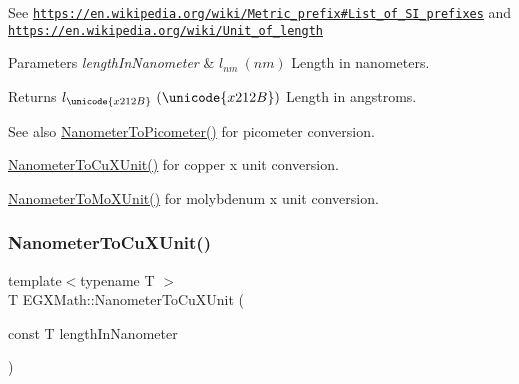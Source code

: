 See \href{https://en.wikipedia.org/wiki/Metric_prefix#List_of_SI_prefixes}{\tt https\+://en.\+wikipedia.\+org/wiki/\+Metric\+\_\+prefix\#\+List\+\_\+of\+\_\+\+S\+I\+\_\+prefixes} and \href{https://en.wikipedia.org/wiki/Unit_of_length}{\tt https\+://en.\+wikipedia.\+org/wiki/\+Unit\+\_\+of\+\_\+length} 
\begin{DoxyParams}{Parameters}
{\em length\+In\+Nanometer} & $ l_{nm}\ (nm)$ Length in nanometers. \\
\hline
\end{DoxyParams}
\begin{DoxyReturn}{Returns}
$ l_{\unicode{x212B}}\ (\unicode{x212B})$ Length in angstroms. 
\end{DoxyReturn}
\begin{DoxySeeAlso}{See also}
\mbox{\hyperlink{group___e_g_x_math-_conversions-_length_conversions-_s_i-_nanometer-_s_i_gaba1e9bf91f6e065f8ba8be8dd039b499}{Nanometer\+To\+Picometer()}} for picometer conversion. 

\mbox{\hyperlink{group___e_g_x_math-_conversions-_length_conversions-_s_i-_nanometer-_non-_s_i_ga59399657caa5a9c81df2ffbe1ff7683c}{Nanometer\+To\+Cu\+X\+Unit()}} for copper x unit conversion. 

\mbox{\hyperlink{group___e_g_x_math-_conversions-_length_conversions-_s_i-_nanometer-_non-_s_i_gacc6d7fa95c35687718c816df3c95c7b5}{Nanometer\+To\+Mo\+X\+Unit()}} for molybdenum x unit conversion. 
\end{DoxySeeAlso}
\mbox{\label{group___e_g_x_math-_conversions-_length_conversions-_s_i-_nanometer-_non-_s_i_ga59399657caa5a9c81df2ffbe1ff7683c}} 
\subsubsection{\texorpdfstring{Nanometer\+To\+Cu\+X\+Unit()}{NanometerToCuXUnit()}}
{\footnotesize\ttfamily template$<$typename T $>$ \\
T E\+G\+X\+Math\+::\+Nanometer\+To\+Cu\+X\+Unit (\begin{DoxyParamCaption}\item[{const T}]{length\+In\+Nanometer }\end{DoxyParamCaption})}



